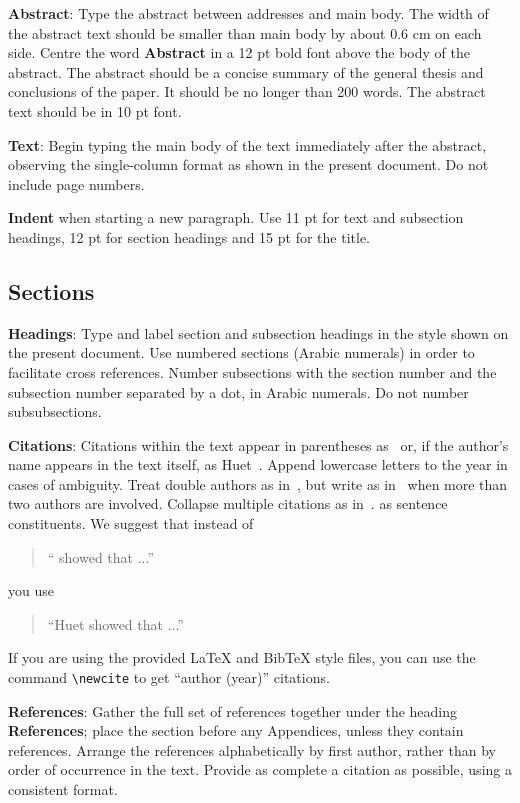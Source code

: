\documentclass[11pt]{article}
\begin{document}
{\bf Abstract}: Type the abstract between addresses and main body.
The width of the abstract text should be
smaller than main body by about 0.6 cm on each side.
Centre the word {\bf Abstract} in a 12 pt bold
font above the body of the abstract. The abstract should be a concise
summary of the general thesis and conclusions of the paper. It should
be no longer than 200 words. The abstract text should be in 10 pt font.

{\bf Text}: Begin typing the main body of the text immediately after
the abstract, observing the single-column format as shown in
the present document. Do not include page numbers.

{\bf Indent} when starting a new paragraph. Use 11 pt for text and
subsection headings, 12 pt for section headings and 15 pt for
the title.

\subsection{Sections}

{\bf Headings}: Type and label section and subsection headings in the
style shown on the present document.  Use numbered sections (Arabic
numerals) in order to facilitate cross references. Number subsections
with the section number and the subsection number separated by a dot,
in Arabic numerals. Do not number subsubsections.

{\bf Citations}: Citations within the text appear in parentheses
as~\cite{zen2} or, if the author's name appears in the text
itself, as Huet~.  Append lowercase letters
to the year in cases of ambiguity.  Treat double authors as
in~\cite{scharf-hyman09}, but write as in~\cite{platform12} when more than two
authors are involved. Collapse multiple citations as
in~\cite{zen2,platform12}.
as sentence constituents. We suggest that instead of
\begin{quote}
  ``\cite{zen2} showed that ...''
\end{quote}
you use
\begin{quote}
``Huet    showed that ...''
\end{quote}

If you are using the provided \LaTeX{} and Bib\TeX{} style files, you
can use the command \verb|\newcite| to get ``author (year)'' citations.

\textbf{References}: Gather the full set of references together under
the heading {\bf References}; place the section before any Appendices,
unless they contain references. Arrange the references alphabetically
by first author, rather than by order of occurrence in the text.
Provide as complete a citation as possible, using a consistent format.
\end{document}
